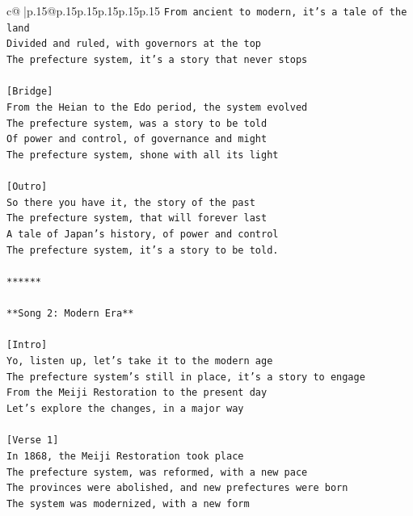 \documentclass{article}
\begin{document}
{\begin{supertabular}{c@{$\;$}|p{.15\linewidth}@{}p{.15\linewidth}p{.15\linewidth}p{.15\linewidth}p{.15\linewidth}p{.15\linewidth}}
{{{\texttt{From ancient to modern, it's a tale of the land} \\
\texttt{Divided and ruled, with governors at the top} \\
\texttt{The prefecture system, it's a story that never stops} \\
\\ 
\texttt{{[}Bridge{]}} \\
\texttt{From the Heian to the Edo period, the system evolved} \\
\texttt{The prefecture system, was a story to be told} \\
\texttt{Of power and control, of governance and might} \\
\texttt{The prefecture system, shone with all its light} \\
\\ 
\texttt{{[}Outro{]}} \\
\texttt{So there you have it, the story of the past} \\
\texttt{The prefecture system, that will forever last} \\
\texttt{A tale of Japan's history, of power and control} \\
\texttt{The prefecture system, it's a story to be told.} \\
\\ 
\texttt{******} \\
\\ 
\texttt{**Song 2: Modern Era**} \\
\\ 
\texttt{{[}Intro{]}} \\
\texttt{Yo, listen up, let's take it to the modern age} \\
\texttt{The prefecture system's still in place, it's a story to engage} \\
\texttt{From the Meiji Restoration to the present day} \\
\texttt{Let's explore the changes, in a major way} \\
\\ 
\texttt{{[}Verse 1{]}} \\
\texttt{In 1868, the Meiji Restoration took place} \\
\texttt{The prefecture system, was reformed, with a new pace} \\
\texttt{The provinces were abolished, and new prefectures were born} \\
\texttt{The system was modernized, with a new form} \\
\\ 
}}}
\end{supertabular}}
\end{document}
